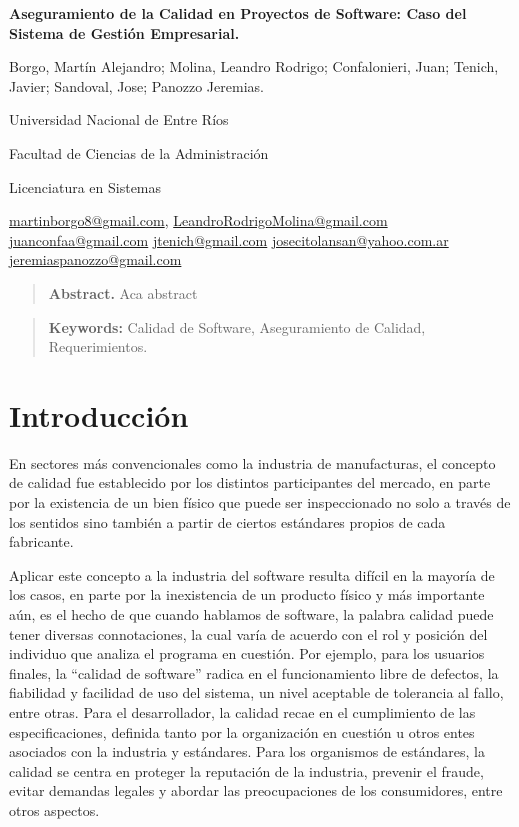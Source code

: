 \documentclass[a4paper,10pt]{article}
\begin{document}
	\centering
	{\fontsize{14}{17}\bfseries Aseguramiento de la Calidad en Proyectos de Software: Caso del Sistema de Gestión Empresarial.\par}
	{\small Borgo, Martín Alejandro; Molina, Leandro Rodrigo; Confalonieri, Juan; Tenich, Javier; Sandoval, Jose; Panozzo Jeremias.\par}
	{\normalsize Universidad Nacional de Entre Ríos\par}
	{\normalsize Facultad de Ciencias de la Administración\par}
	{\normalsize Licenciatura en Sistemas\par}
	{\small
		\href{mailto:martinborgo8@gmail.com}{martinborgo8@gmail.com},
		\href{mailto:LeandroRodrigoMolina@gmail.com}{LeandroRodrigoMolina@gmail.com}
		\href{mailto:juanconfaa@gmail.com}{juanconfaa@gmail.com}
		\href{mailto:jtenich@gmail.com}{jtenich@gmail.com}
		\href{mailto:josecitolansan@yahoo.com.ar}{josecitolansan@yahoo.com.ar}
		\href{mailto:jeremiaspanozzo@gmail.com}{jeremiaspanozzo@gmail.com}
		\par}	
	{\begin{quote} \small \justify\textbf{Abstract.} Aca abstract \end{quote} \par}
	{\begin{quote} \small \justify\textbf{Keywords:} Calidad de Software, Aseguramiento de Calidad, Requerimientos. \end{quote} \par}
	
	\justifying
	
	\section{Introducción}
	
	En sectores más convencionales como la industria de manufacturas, el concepto de calidad fue establecido por los distintos participantes del mercado, en parte por la existencia de un bien físico que puede ser inspeccionado no solo a través de los sentidos sino también a partir de ciertos estándares propios de cada fabricante.
	
	Aplicar este concepto a la industria del software resulta difícil en la mayoría de los casos, en parte por la inexistencia de un producto físico y más importante aún, es el hecho de que cuando hablamos de software, la palabra calidad puede tener diversas connotaciones, la cual varía de acuerdo con el rol y posición del individuo que analiza el programa en cuestión. Por ejemplo, para los usuarios finales, la “calidad de software” radica en el funcionamiento libre de defectos, la fiabilidad y facilidad de uso del sistema, un nivel aceptable de tolerancia al fallo, entre otras. Para el desarrollador, la calidad recae en el cumplimiento de las especificaciones, definida tanto por la organización en cuestión u otros entes asociados con la industria y estándares. Para los organismos de estándares, la calidad se centra en proteger la reputación de la industria, prevenir el fraude, evitar demandas legales y abordar las preocupaciones de los consumidores, entre otros aspectos.
	
\end{document}
